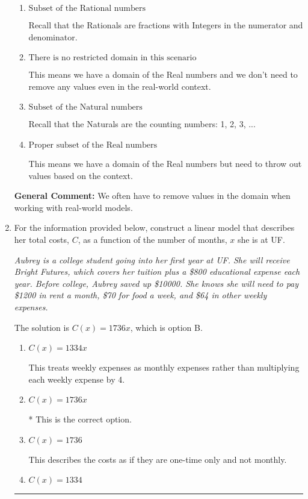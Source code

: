 \documentclass{extbook}[14pt]
\newcommand{\litem}[1]{\item #1

\rule{\textwidth}{0.4pt}}
\begin{document}
\begin{enumerate}
{\begin{enumerate}[label=\Alph*.]
Recall that the Integers are the positive and negative counting numbers: ..., -3, -2, -1, 0, 1, 2, 3, ... 
\item \( \text{Subset of the Rational numbers} \)

Recall that the Rationals are fractions with Integers in the numerator and denominator.
\item \( \text{There is no restricted domain in this scenario} \)

This means we have a domain of the Real numbers and we don't need to remove any values even in the real-world context.
\item \( \text{Subset of the Natural numbers} \)

Recall that the Naturals are the counting numbers: 1, 2, 3, ...
\item \( \text{Proper subset of the Real numbers} \)

This means we have a domain of the Real numbers but need to throw out values based on the context.
\end{enumerate}

\textbf{General Comment:} We often have to remove values in the domain when working with real-world models.
}
\litem{
For the information provided below, construct a linear model that describes her total costs, $C$, as a function of the number of months, $x$ she is at UF. 

\begin{center}
    \textit{ Aubrey is a college student going into her first year at UF. She will receive Bright Futures, which covers her tuition plus a \$800 educational expense each year. Before college, Aubrey saved up \$10000. She knows she will need to pay \$1200 in rent a month, \$70 for food a week, and \$64 in other weekly expenses. }
\end{center}
The solution is \( C(x) = 1736 x \), which is option B.\begin{enumerate}[label=\Alph*.]
\item \( C(x) = 1334 x \)

This treats weekly expenses as monthly expenses rather than multiplying each weekly expense by 4.
\item \( C(x) = 1736 x \)

* This is the correct option.
\item \( C(x) = 1736 \)

This describes the costs as if they are one-time only and not monthly.
\item \( C(x) = 1334 \)


\end{enumerate}}
\end{enumerate}
\end{document}
